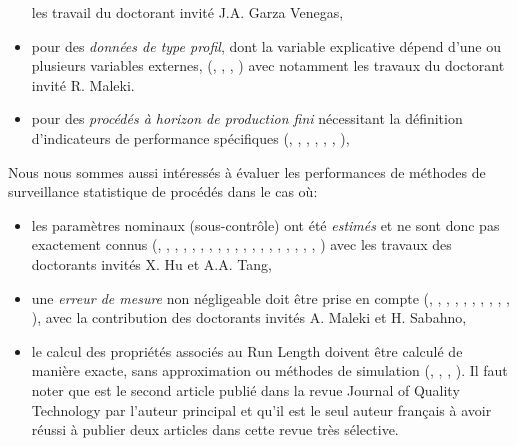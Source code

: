 \begin{itemize}
  les travail du doctorant invité J.A. Garza Venegas,
\item pour des \emph{données de type profil}, dont la variable
  explicative dépend d'une ou plusieurs variables externes,
  (\cite{maleki:hal-02183432}, \cite{maleki:hal-01870773},
  \cite{maleki:hal-01905445}, \cite{guevara:hal-01580777}) avec
  notamment les travaux du doctorant invité R. Maleki.
\item pour des \emph{procédés à horizon de production fini}
  nécessitant la définition d'indicateurs de performance spécifiques
  (\cite{chong:hal-01978750}, \cite{celano:hal-01921379},
  \cite{celano:hal-01921386}, \cite{nenes:hal-01425549},
  \cite{celano:hal-01313577}, \cite{celano:hal-01367280},
  \cite{celano:hal-01382239}),
\end{itemize}

Nous nous sommes aussi intéressés à évaluer les performances de
méthodes de surveillance statistique de procédés dans le cas où:
\begin{itemize}
\item les paramètres nominaux (sous-contrôle) ont été \emph{estimés}
  et ne sont donc pas exactement connus (\cite{chong:hal-01978769},
  \cite{tang:hal-02015138}, \cite{tang:hal-02145998},
  \cite{hu:hal-02155302}, \cite{hu:hal-02160997},
  \cite{castagliola:hal-02190734}, \cite{hu:hal-02318364},
  \cite{khoo:hal-02354567}, \cite{hu:hal-01835841},
  \cite{oprime:hal-01421764}, \cite{you:hal-01614074},
  \cite{teoh:hal-01583912}, \cite{hu:hal-01668745},
  \cite{wu:hal-01286478}, \cite{teoh:hal-01326056},
  \cite{castagliola:hal-01349529}, \cite{yeong:hal-01180304},
  \cite{teoh:hal-01185340}, \cite{you:hal-01216234},
  \cite{you:hal-01348052}) avec les travaux des doctorants invités
  X. Hu et A.A. Tang,
\item une \emph{erreur de mesure} non négligeable doit être prise en
  compte (\cite{sabahno:hal-01977765}, \cite{tang:hal-01978754},
  \cite{sabahno:hal-02190729}, \cite{tang:hal-01806538},
  \cite{sabahno:hal-01921390}, \cite{maleki:hal-01423386},
  \cite{tran:hal-01668732}, \cite{hu:hal-01307056},
  \cite{hu:hal-01327313}, \cite{hu:hal-01396018},
  \cite{hu:hal-01228430}), avec la contribution des doctorants invités
  A. Maleki et H. Sabahno,
\item le calcul des propriétés associés au Run Length doivent être
  calculé de manière exacte, sans approximation ou méthodes de
  simulation (\cite{castagliola:hal-02002980},
  \cite{maravelakis:hal-02022526}, \cite{tang:hal-02059892},
  \cite{khoo:hal-01354062}). Il faut noter que
  \cite{castagliola:hal-02002980} est le second article publié dans la
  revue Journal of Quality Technology par l'auteur principal et qu'il
  est le seul auteur français à avoir réussi à publier deux articles
  dans cette revue très sélective.
\end{itemize}

